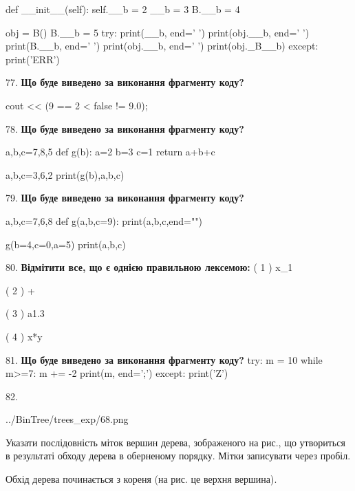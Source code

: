 \documentclass[11pt]{article}
\begin{document}
    def __init__(self):
        self.__b = 2
        __b = 3
        B.__b = 4

obj = B()
B.__b = 5
try:
    print(__b, end=' ')
    print(obj.__b, end=' ')
    print(B.__b, end=' ')
    print(obj.__b, end=' ')
    print(obj._B__b)
except:
    print('ERR')
\par\vspace{5mm}

77. \textbf{Що буде виведено за виконання фрагменту коду?}

cout << (9 == 2 < false != 9.0);
\par\vspace{5mm}

78. \textbf{Що буде виведено за виконання фрагменту коду?}

a,b,c=7,8,5
def g(b):
    a=2
    b=3
    c=1
    return a+b+c

a,b,c=3,6,2
print(g(b),a,b,c)
\par\vspace{5mm}

79. \textbf{Що буде виведено за виконання фрагменту коду?}

a,b,c=7,6,8
def g(a,b,c=9):
    print(a,b,c,end="")

g(b=4,c=0,a=5)
print(a,b,c)

\par\vspace{5mm}

80. %
\textbf{Відмітити все, що є однією правильною лексемою:}
( 1 ) x_1

( 2 ) +

( 3 ) a1.3

( 4 ) x*y
\par\vspace{5mm}

81. \textbf{Що буде виведено за виконання фрагменту коду?}
try:
    m = 10
    while m>=7:
        m += -2
    print(m, end=';')
except:
    print('Z')
\par\vspace{5mm}

82. 

\begin{center}
	{../BinTree/trees_exp/68.png}
\end{center}
Указати послідовність міток вершин дерева, зображеного на рис., що утвориться в результаті обходу дерева в оберненому порядку. Мітки записувати через пробіл.\par Обхід дерева починається з кореня (на рис. це верхня вершина).
\par\vspace{5mm}
\end{document}
